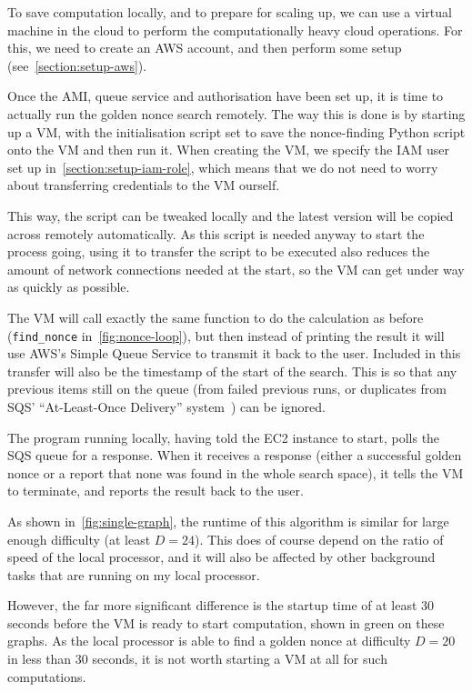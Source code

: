 \documentclass[letterpaper,twocolumn,11pt]{article}
\begin{document}
To save computation locally, and to prepare for scaling up, we can use a virtual machine in the cloud to perform the computationally heavy cloud operations. For this, we need to create an AWS account, and then perform some setup (see~\autoref{section:setup-aws}).

Once the AMI, queue service and authorisation have been set up, it is time to actually run the golden nonce search remotely. The way this is done is by starting up a VM, with the initialisation script set to save the nonce-finding Python script onto the VM and then run it. When creating the VM, we specify the IAM user set up in~\autoref{section:setup-iam-role}, which means that we do not need to worry about transferring credentials to the VM ourself.

This way, the script can be tweaked locally and the latest version will be copied across remotely automatically. As this script is needed anyway to start the process going, using it to transfer the script to be executed also reduces the amount of network connections needed at the start, so the VM can get under way as quickly as possible.

The VM will call exactly the same function to do the calculation as before (\verb|find_nonce| in~\autoref{fig:nonce-loop}), but then instead of printing the result it will use AWS's Simple Queue Service to transmit it back to the user. Included in this transfer will also be the timestamp of the start of the search. This is so that any previous items still on the queue (from failed previous runs, or duplicates from SQS' ``At-Least-Once Delivery'' system~\cite{sqs-al1}) can be ignored.

The program running locally, having told the EC2 instance to start, polls the SQS queue for a response. When it receives a response (either a successful golden nonce or a report that none was found in the whole search space), it tells the VM to terminate, and reports the result back to the user.

As shown in~\autoref{fig:single-graph}, the runtime of this algorithm is similar for large enough difficulty (at least $D = 24$). This does of course depend on the ratio of speed of the local processor, and it will also be affected by other background tasks that are running on my local processor.

However, the far more significant difference is the startup time of at least 30 seconds before the VM is ready to start computation, shown in green on these graphs. As the local processor is able to find a golden nonce at difficulty $D = 20$ in less than 30 seconds, it is not worth starting a VM at all for such computations.
\end{document}
